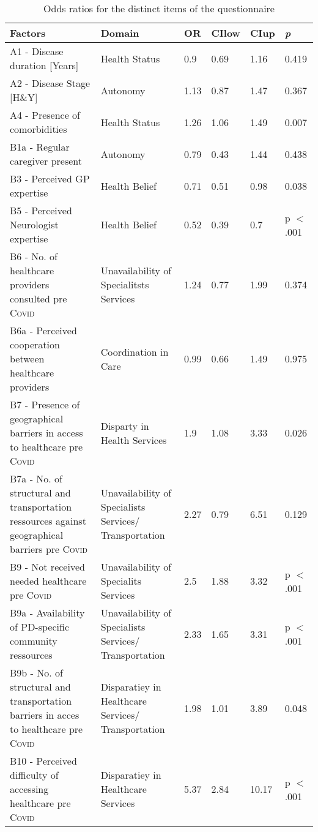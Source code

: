 \documentclass[a4paper,oneside,11pt,english]{scrartcl}
\begin{document}
\newpage
\begin{longtable}[ht!]{|p{5.5cm} | p{3.5cm} | p{1cm} | l | l | p{1.5cm} |}
		\caption{Odds ratios for the distinct items of the questionnaire} 
		\label{tab4:resultsall1} \\ \hline
		\textbf{Factors} & \textbf{Domain} & \textbf{OR} & \textbf{CIlow} & \textbf{CIup} & \textbf{\textit{p}} \\ \hline
		\endhead
		A1 - Disease duration [Years] & Health Status & 0.9 & 0.69 & 1.16 & 0.419 \\ \hline
		A2 - Disease Stage [H\&Y] & Autonomy & 1.13 & 0.87 & 1.47 & 0.367 \\ \hline
		A4 - Presence of comorbidities & Health Status & 1.26 & 1.06 & 1.49 & 0.007 \\ \hline
		B1a - Regular caregiver present & Autonomy & 0.79 & 0.43 & 1.44 & 0.438 \\ \hline
		B3 - Perceived GP expertise & Health Belief & 0.71 & 0.51 & 0.98 & 0.038 \\ \hline
		B5 - Perceived Neurologist expertise & Health Belief & 0.52 & 0.39 & 0.7 & p $<$ .001 \\ \hline
		B6 - No. of healthcare providers consulted pre \textsc{Covid} & Unavailability of Specialitsts Services & 1.24 & 0.77 & 1.99 & 0.374 \\ \hline
		B6a - Perceived cooperation between healthcare providers & Coordination in Care & 0.99 & 0.66 & 1.49 & 0.975 \\ \hline
		B7 - Presence of geographical barriers in access to healthcare pre \textsc{Covid} & Disparty in Health Services & 1.9 & 1.08 & 3.33 & 0.026 \\ \hline
		B7a - No. of structural and transportation ressources against geographical barriers pre \textsc{Covid} & Unavailability of Specialists Services/ Transportation & 2.27 & 0.79 & 6.51 & 0.129 \\ \hline
		B9 - Not received needed healthcare pre \textsc{Covid} & Unavailability of Specialits Services & 2.5 & 1.88 & 3.32 & p $<$ .001 \\ \hline
		B9a - Availability of \textsc{PD}-specific community ressources & Unavailability of Specialists Services/ Transportation & 2.33 & 1.65 & 3.31 & p $<$ .001 \\ \hline
		B9b - No. of structural and transportation barriers in acces to healthcare pre \textsc{Covid} & Disparatiey in Healthcare Services/ Transportation & 1.98 & 1.01 & 3.89 & 0.048 \\ \hline
		B10 - Perceived difficulty of accessing healthcare pre \textsc{Covid} & Disparatiey in Healthcare Services & 5.37 & 2.84 & 10.17 & p $<$ .001 \\ \hline

\end{longtable}
\end{document}
